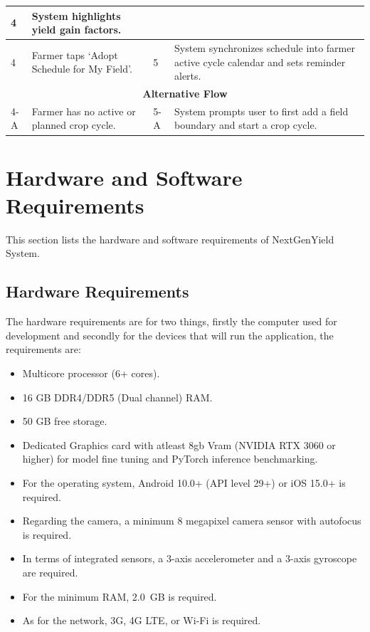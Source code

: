 \documentclass{FastFyp}
\begin{document}
\begin{table}[!ht]
\begin{tabular}{|lllll|}
  \multicolumn{1}{p{0.8cm}|}{4} &
  \multicolumn{1}{p{5.6cm}|}{System highlights yield gain factors.} \\ \hline
\multicolumn{1}{|p{0.8cm}|}{4} &
  \multicolumn{2}{p{6.0cm}|}{Farmer taps `Adopt Schedule for My Field'.} &
  \multicolumn{1}{p{0.8cm}|}{5} &
  \multicolumn{1}{p{5.6cm}|}{System synchronizes schedule into farmer active cycle calendar and sets reminder alerts.} \\ \hline
\multicolumn{5}{|c|}{\textbf{Alternative Flow}} \\ \hline
\multicolumn{1}{|p{0.8cm}|}{4-A} &
  \multicolumn{2}{p{6.0cm}|}{Farmer has no active or planned crop cycle.} &
  \multicolumn{1}{p{0.8cm}|}{5-A} &
  \multicolumn{1}{p{5.6cm}|}{System prompts user to first add a field boundary and start a crop cycle.} \\ \hline
\end{tabular}
\end{table}

\clearpage
\section{Hardware and Software Requirements}
This section lists the hardware and software requirements of NextGenYield System.
\subsection{Hardware Requirements}
The hardware requirements are for two things, firstly the computer used for development and secondly for the devices that will run the application, the requirements are:

    \begin{itemize}
    \item Multicore processor (6+ cores).
    \item 16 GB DDR4/DDR5 (Dual channel) RAM.
    \item 50 GB free storage.
    \item Dedicated Graphics card with atleast 8gb Vram (NVIDIA RTX 3060 or higher) for model fine tuning and PyTorch inference benchmarking.
    \item For the operating system, Android 10.0+ (API level 29+) or iOS 15.0+ is required.
    \item Regarding the camera, a minimum 8 megapixel camera sensor with autofocus is required.
    \item In terms of integrated sensors, a 3-axis accelerometer and a 3-axis gyroscope are required.
    \item For the minimum RAM, 2.0~GB is required.
    \item As for the network, 3G, 4G LTE, or Wi-Fi is required.
\end{itemize}
\end{document}
